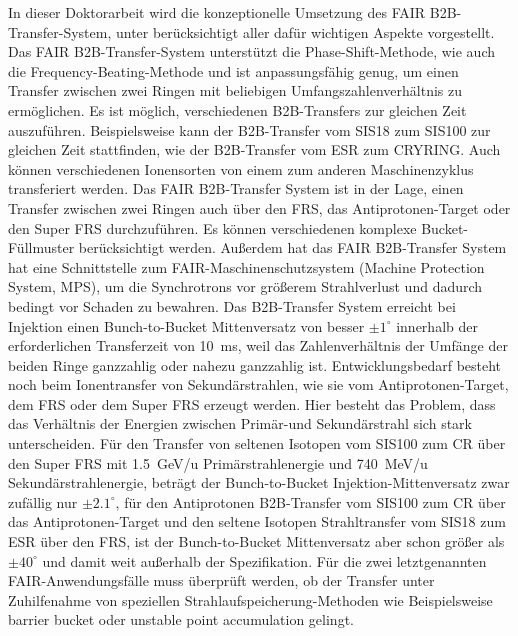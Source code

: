 In dieser Doktorarbeit wird die konzeptionelle Umsetzung des FAIR B2B-Transfer-System, unter ber\"ucksichtigt aller daf\"ur wichtigen Aspekte vorgestellt. Das FAIR B2B-Transfer-System unterst\"utzt die Phase-Shift-Methode, wie auch die Frequency-Beating-Methode und ist anpassungsf\"ahig genug, um einen Transfer zwischen zwei Ringen mit beliebigen Umfangszahlenverh\"altnis zu erm\"oglichen. Es ist m\"oglich, verschiedenen B2B-Transfers zur gleichen Zeit auszuf\"uhren. Beispielsweise kann der B2B-Transfer vom SIS18 zum SIS100 zur gleichen Zeit stattfinden, wie der B2B-Transfer vom ESR zum CRYRING. Auch k\"onnen verschiedenen Ionensorten von einem zum anderen Maschinenzyklus transferiert werden. Das FAIR B2B-Transfer System ist in der Lage, einen Transfer zwischen zwei Ringen auch \"uber den FRS, das Antiprotonen-Target oder den Super FRS durchzuf\"uhren. Es k\"onnen verschiedenen komplexe Bucket-F\"ullmuster ber\"ucksichtigt werden. Au\ss{}erdem hat das FAIR B2B-Transfer System hat eine Schnittstelle zum FAIR-Maschinenschutzsystem (Machine Protection System, MPS), um die Synchrotrons vor gr\"o\ss{}erem Strahlverlust und dadurch bedingt vor Schaden zu bewahren. 
Das B2B-Transfer System erreicht bei Injektion einen Bunch-to-Bucket Mittenversatz von besser $\pm1^\circ$ innerhalb der erforderlichen Transferzeit von \SI{10}{\ms}, weil das Zahlenverh\"altnis der Umf\"ange der beiden Ringe ganzzahlig oder nahezu ganzzahlig ist. Entwicklungsbedarf besteht noch beim Ionentransfer von Sekund\"arstrahlen, wie sie vom Antiprotonen-Target, dem FRS oder dem Super FRS erzeugt werden. Hier besteht das Problem, dass das Verh\"altnis der Energien zwischen Prim\"ar-und
Sekund\"arstrahl sich stark unterscheiden. F\"ur den Transfer von seltenen Isotopen vom SIS100 zum CR \"uber den Super FRS mit \SI{1.5}{GeV/u} Prim\"arstrahlenergie und \SI{740}{MeV/u} Sekund\"arstrahlenergie, betr\"agt der Bunch-to-Bucket Injektion-Mittenversatz zwar zufällig nur $\pm2.1^\circ$, f\"ur den Antiprotonen B2B-Transfer vom SIS100 zum CR \"uber das Antiprotonen-Target und den seltene Isotopen Strahltransfer vom SIS18 zum ESR \"uber den FRS, ist der Bunch-to-Bucket Mittenversatz aber schon gr\"o\ss{}er als $\pm40^\circ$ und damit weit au\ss{}erhalb der Spezifikation. F\"ur die zwei letztgenannten FAIR-Anwendungsf\"alle muss \"uberpr\"uft werden, ob der Transfer unter Zuhilfenahme von speziellen Strahlaufspeicherung-Methoden wie Beispielsweise barrier bucket oder unstable point accumulation gelingt.

